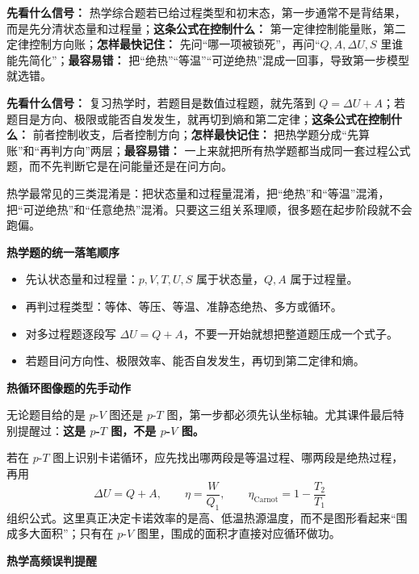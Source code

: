\documentclass[lang=cn,11pt]{elegantbook}
\begin{document}
\begin{note}
\textbf{先看什么信号：} 热学综合题若已给过程类型和初末态，第一步通常不是背结果，而是先分清状态量和过程量；\textbf{这条公式在控制什么：} 第一定律控制能量账，第二定律控制方向账；\textbf{怎样最快记住：} 先问“哪一项被锁死”，再问“\(Q,A,\Delta U,S\) 里谁能先简化”；\textbf{最容易错：} 把“绝热”“等温”“可逆绝热”混成一回事，导致第一步模型就选错。
\end{note}

\begin{note}
\textbf{先看什么信号：} 复习热学时，若题目是数值过程题，就先落到 \(Q=\Delta U+A\)；若题目是方向、极限或能否自发发生，就再切到熵和第二定律；\textbf{这条公式在控制什么：} 前者控制收支，后者控制方向；\textbf{怎样最快记住：} 把热学题分成“先算账”和“再判方向”两层；\textbf{最容易错：} 一上来就把所有热学题都当成同一套过程公式题，而不先判断它是在问能量还是在问方向。
\end{note}

\begin{remark}
热学最常见的三类混淆是：把状态量和过程量混淆，把“绝热”和“等温”混淆，把“可逆绝热”和“任意绝热”混淆。只要这三组关系理顺，很多题在起步阶段就不会跑偏。
\end{remark}

\textbf{热学题的统一落笔顺序}

\begin{itemize}
  \item 先认状态量和过程量：\(p,V,T,U,S\) 属于状态量，\(Q,A\) 属于过程量。
  \item 再判过程类型：等体、等压、等温、准静态绝热、多方或循环。
  \item 对多过程题逐段写 \(\Delta U=Q+A\)，不要一开始就想把整道题压成一个式子。
  \item 若题目问方向性、极限效率、能否自发发生，再切到第二定律和熵。
\end{itemize}

\textbf{热循环图像题的先手动作}

无论题目给的是 \(p\)-\(V\) 图还是 \(p\)-\(T\) 图，第一步都必须先认坐标轴。尤其课件最后特别提醒过：\textbf{这是 \(p\)-\(T\) 图，不是 \(p\)-\(V\) 图。}

若在 \(p\)-\(T\) 图上识别卡诺循环，应先找出哪两段是等温过程、哪两段是绝热过程，再用
\[
\Delta U=Q+A,\qquad \eta=\frac{W}{Q_1},\qquad \eta_{\text{Carnot}}=1-\frac{T_2}{T_1}
\]
组织公式。这里真正决定卡诺效率的是高、低温热源温度，而不是图形看起来“围成多大面积”；只有在 \(p\)-\(V\) 图里，围成的面积才直接对应循环做功。

\textbf{热学高频误判提醒}
\end{document}
